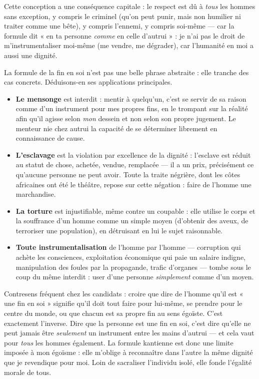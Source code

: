 \documentclass[11pt]{article}
\newcounter{popsec}
\newcounter{popsub}
\newcommand{\courssub}[1]{%
  \stepcounter{popsub}%
  \par\vspace{9pt}\noindent{\popxbold\fontsize{11.5}{13}\selectfont\color{popink}{\color{poporange}\thepopsec.\thepopsub}\hspace{6pt}#1}\par\nopagebreak\vspace{4pt}
}
\begin{document}
Cette conception a une conséquence capitale : le respect est dû à \emph{tous} les hommes sans exception, y compris le criminel (qu'on peut punir, mais non humilier ni traiter comme une bête), y compris l'ennemi, y compris soi-même — car la formule dit « en ta personne \emph{comme} en celle d'autrui » : je n'ai pas le droit de m'instrumentaliser moi-même (me vendre, me dégrader), car l'humanité en moi a aussi une dignité.

\courssub{Conséquences pratiques de la formule}

La formule de la fin en soi n'est pas une belle phrase abstraite : elle tranche des cas concrets. Déduisons-en ses applications principales.

\begin{itemize}
\item \textbf{Le mensonge} est interdit : mentir à quelqu'un, c'est se servir de sa raison comme d'un instrument pour mes propres fins, en le trompant sur la réalité afin qu'il agisse selon \emph{mon} dessein et non selon son propre jugement. Le menteur nie chez autrui la capacité de se déterminer librement en connaissance de cause.
\item \textbf{L'esclavage} est la violation par excellence de la dignité : l'esclave est réduit au statut de chose, achetée, vendue, remplacée — il a un prix, précisément ce qu'aucune personne ne peut avoir. Toute la traite négrière, dont les côtes africaines ont été le théâtre, repose sur cette négation : faire de l'homme une marchandise.
\item \textbf{La torture} est injustifiable, même contre un coupable : elle utilise le corps et la souffrance d'un homme comme un simple moyen (d'obtenir des aveux, de terroriser une population), en détruisant en lui le sujet raisonnable.
\item \textbf{Toute instrumentalisation} de l'homme par l'homme — corruption qui achète les consciences, exploitation économique qui paie un salaire indigne, manipulation des foules par la propagande, trafic d'organes — tombe sous le coup du même interdit : user d'une personne \emph{simplement} comme d'un moyen.
\end{itemize}

\begin{attention}
Contresens fréquent chez les candidats : croire que dire de l'homme qu'il est « une fin en soi » signifie qu'il doit tout faire pour lui-même, se prendre pour le centre du monde, ou que chacun est sa propre fin au sens égoïste. C'est exactement l'inverse. Dire que la personne est une fin en soi, c'est dire qu'elle ne peut jamais être \emph{seulement} un instrument entre les mains d'autrui — et cela vaut pour \emph{tous} les hommes également. La formule kantienne est donc une limite imposée à mon égoïsme : elle m'oblige à reconnaître dans l'autre la même dignité que je revendique pour moi. Loin de sacraliser l'individu isolé, elle fonde l'égalité morale de tous.
\end{attention}
\end{document}
